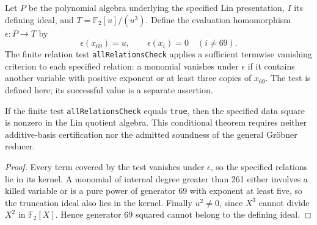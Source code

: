 \begin{definition}
  \label{def:lin-square-detector}
  \leanok
  Let $P$ be the polynomial algebra underlying the specified Lin
  presentation, $I$ its defining ideal, and $T=\mathbb F_2[u]/(u^3)$.
  Define the evaluation homomorphism $\epsilon:P\to T$ by
  \[
    \epsilon(x_{69})=u,\qquad\epsilon(x_i)=0\quad(i\ne69).
  \]
  The finite relation test \texttt{allRelationsCheck} applies a sufficient
  termwise vanishing criterion to each specified relation: a monomial
  vanishes under $\epsilon$ if it contains another variable with positive
  exponent or at least three copies of $x_{69}$. The test is defined here;
  its successful value is a separate assertion.
\end{definition}

\begin{proposition}
  \label{prop:lin-square-detector-sound}
  \leanok
  If the finite test \texttt{allRelationsCheck} equals \texttt{true}, then
  the specified data square is nonzero in the Lin quotient algebra.
  This conditional theorem requires neither additive-basis certification
  nor the admitted soundness of the general Gr\"obner reducer.
\end{proposition}
\begin{proof}
  Every term covered by the test vanishes under $\epsilon$, so the
  specified relations lie in its kernel. A monomial of internal
  degree greater than 261 either involves a killed variable or is a pure
  power of generator 69 with exponent at least five, so the truncation
  ideal also lies in the kernel. Finally $u^2\ne0$, since $X^3$ cannot
  divide $X^2$ in $\mathbb F_2[X]$. Hence generator 69 squared cannot
  belong to the defining ideal.
  \leanok
\end{proof}

